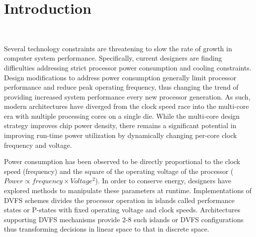 \chapter{Introduction}~\label{chap:intro}


Several technology constraints are threatening to slow the rate of
growth in computer system performance. Specifically, current designers
are finding difficulties addressing strict processor power consumption
and cooling constraints.  Design modifications to address power
consumption generally limit processor performance and reduce peak
operating frequency, thus changing the trend of providing increased
system performance every new processor generation.  As such, modern
architectures have diverged from the clock speed race into the
multi-core era with multiple processing cores on a single die. While
the multi-core design strategy improves chip power density, there
remains a significant potential in improving run-time power
utilization by dynamically changing per-core clock frequency and
voltage.

Power consumption has been observed to be 
directly proportional to the clock speed (frequency) and the 
square of the operating voltage of the processor 
($Power \propto frequency \times Voltage^2$). In order to conserve energy, designers have explored methods to
manipulate these parameters at runtime.
Implementations of DVFS schemes divides the processor operation in islands called 
performance states or P-states with fixed operating voltage and clock speeds. 
Architectures supporting DVFS mechanisms provide 2-8 such islands or DVFS configurations thus transforming
decisions in linear space to that in discrete space. 

